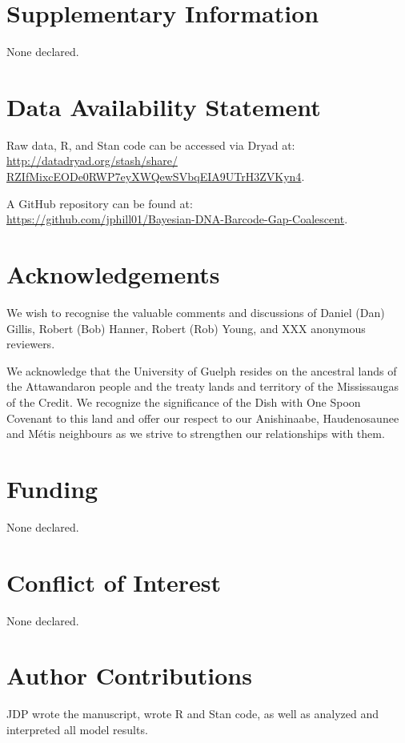 \documentclass[12pt]{article}
\begin{document}
\newpage

\section*{Supplementary Information}

None declared.

\section*{Data Availability Statement}

Raw data, R, and Stan code can be accessed via Dryad at: \\ \href{http://datadryad.org/stash/share/RZIfMixcEODe0RWP7eyXWQewSVbqEIA9UTrH3ZVKyn4}{http://datadryad.org/stash/share/\\RZIfMixcEODe0RWP7eyXWQewSVbqEIA9UTrH3ZVKyn4}.

A GitHub repository can be found at: \\ \href{https://github.com/jphill01/Bayesian-DNA-Barcode-Gap-Coalescent}{https://github.com/jphill01/Bayesian-DNA-Barcode-Gap-Coalescent}.

\section*{Acknowledgements}

We wish to recognise the valuable comments and discussions of Daniel (Dan) Gillis, Robert (Bob) Hanner, Robert (Rob) Young, and XXX anonymous reviewers.

We acknowledge that the University of Guelph resides on the ancestral lands of the Attawandaron people and the treaty lands and territory of the Mississaugas of the Credit. We recognize the significance of the Dish with One Spoon Covenant to this land and offer our respect to our Anishinaabe, Haudenosaunee and M{\'e}tis neighbours as we strive to strengthen our relationships with them.

\section*{Funding}

None declared.

\section*{Conflict of Interest}

None declared.

\section*{Author Contributions}

JDP wrote the manuscript, wrote R and Stan code, as well as analyzed and interpreted all model results. 




\newpage
\end{document}
